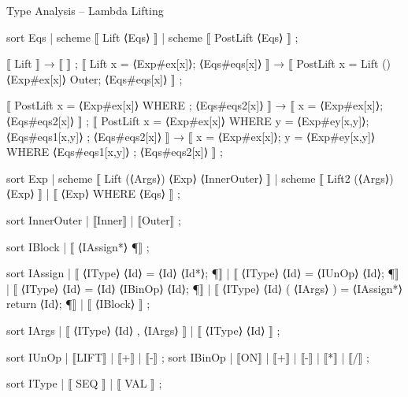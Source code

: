 \documentclass[pdftex,aspectratio=169,14pt]{beamer}
\begin{document}
\begin{frame}[fragile]{Type Analysis -- Lambda Lifting}
\begin{hacs}
sort Eqs  | scheme ⟦ Lift ⟨Eqs⟩ ⟧ | scheme ⟦ PostLift ⟨Eqs⟩ ⟧ ;

⟦ Lift ⟧ →  ⟦ ⟧ ;
⟦ Lift x = ⟨Exp#ex[x]⟩; ⟨Eqs#eqs[x]⟩ ⟧ →  ⟦ PostLift x = Lift () ⟨Exp#ex[x]⟩ Outer; ⟨Eqs#eqs[x]⟩ ⟧ ;

⟦ PostLift x = ⟨Exp#ex[x]⟩ WHERE { }; ⟨Eqs#eqs2[x]⟩ ⟧
  →  ⟦ x = ⟨Exp#ex[x]⟩; ⟨Eqs#eqs2[x]⟩ ⟧ ;
⟦ PostLift x = ⟨Exp#ex[x]⟩ WHERE { y = ⟨Exp#ey[x,y]⟩; ⟨Eqs#eqs1[x,y]⟩ }; ⟨Eqs#eqs2[x]⟩ ⟧
  →  ⟦ x = ⟨Exp#ex[x]⟩; y = ⟨Exp#ey[x,y]⟩ WHERE { ⟨Eqs#eqs1[x,y]⟩ }; ⟨Eqs#eqs2[x]⟩ ⟧ ;

sort Exp  | scheme ⟦ Lift (⟨Args⟩) ⟨Exp⟩ ⟨InnerOuter⟩ ⟧ | scheme ⟦ Lift2 (⟨Args⟩) ⟨Exp⟩ ⟧
          | ⟦ ⟨Exp⟩ WHERE { ⟨Eqs⟩ } ⟧ ;

{ sort InnerOuter  | ⟦Inner⟧ | ⟦Outer⟧ ; }
\end{hacs}
\end{frame}

\begin{frame}[fragile]{}
\end{frame}

\begin{frame}{}
\begin{hacs}
sort IBlock     | ⟦ { ⟨IAssign*⟩ } ¶⟧ ;

sort IAssign    | ⟦ ⟨IType⟩ ⟨Id⟩ = ⟨Id⟩ ⟨Id*⟩; ¶⟧
                | ⟦ ⟨IType⟩ ⟨Id⟩ = ⟨IUnOp⟩ ⟨Id⟩; ¶⟧
                | ⟦ ⟨IType⟩ ⟨Id⟩ = ⟨Id⟩ ⟨IBinOp⟩ ⟨Id⟩; ¶⟧
                | ⟦ ⟨IType⟩ ⟨Id⟩ ( ⟨IArgs⟩ ) = { ⟨IAssign*⟩ return ⟨Id⟩; } ¶⟧
                | ⟦ ⟨IBlock⟩ ⟧
                ;

sort IArgs      | ⟦ ⟨IType⟩ ⟨Id⟩ , ⟨IArgs⟩ ⟧ | ⟦ ⟨IType⟩ ⟨Id⟩ ⟧ ;

sort IUnOp      | ⟦LIFT⟧ | ⟦+⟧ | ⟦-⟧ ;
sort IBinOp     | ⟦ON⟧ | ⟦+⟧ | ⟦-⟧ | ⟦*⟧ | ⟦/⟧ ;

sort IType      | ⟦ SEQ ⟧ | ⟦ VAL ⟧ ;
\end{hacs}
\end{frame}
\end{document}
